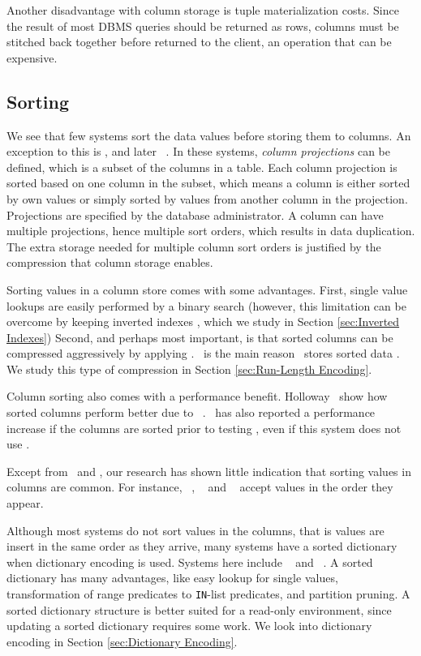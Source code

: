 Another disadvantage with column storage is tuple materialization costs. Since the result of most DBMS queries should be returned as rows, columns must be stitched back together before returned to the client, an operation that can be expensive.


\subsection{Sorting}
\label{sub:Sorting}
We see that few systems sort the data values before storing them to columns. An exception to this is \cstore, and later \vertica~\cite{Lamb2012-kg, Stonebraker2005-qz}. In these systems, \textit{column projections} can be defined, which is a subset of the columns in a table. Each column projection is sorted based on one column in the subset, which means a column is either sorted by own values or simply sorted by values from another column in the projection. Projections are specified by the database administrator. A column can have multiple projections, hence multiple sort orders, which results in data duplication. The extra storage needed for multiple column sort orders is justified by the compression that column storage enables.


Sorting values in a column store comes with some advantages. First, single value lookups are easily performed by a binary search (however, this limitation can be overcome by keeping inverted indexes \cite{Lemke2010-is, Schwalb2014-hn}, which we study in Section \ref{sec:Inverted Indexes}) Second, and perhaps most important, is that sorted columns can be compressed aggressively by applying \rle. \rle~is the main reason \cstore~stores sorted data \cite{Stonebraker2005-qz}. We study this type of compression in Section \ref{sec:Run-Length Encoding}.

Column sorting also comes with a performance benefit. Holloway \ea~show how sorted columns perform better due to \rle~\cite{Holloway2008-rr}. \blink~has also reported a performance increase if the columns are sorted prior to testing \cite{Johnson2008-cp}, even if this system does not use \rle.

Except from \cstore~and \vertica, our research has shown little indication that sorting values in columns are common. For instance, \mssql~\cite{Larson2013-mc}, \blink~\cite{Raman2013-em} and \oracle~\cite{Lahiri2015-mz} accept values in the order they appear.

Although most systems do not sort values in the columns, that is values are insert in the same order as they arrive, many systems have a sorted dictionary when dictionary encoding is used. Systems here include \blink~\cite{Johnson2008-cp} and \saph~\cite{Farber2012-vh}. A sorted dictionary has many advantages, like easy lookup for single values, transformation of range predicates to \texttt{IN}-list predicates, and partition pruning. A sorted dictionary structure is better suited for a read-only environment, since updating a sorted dictionary requires some work. We look into dictionary encoding in Section \ref{sec:Dictionary Encoding}.

